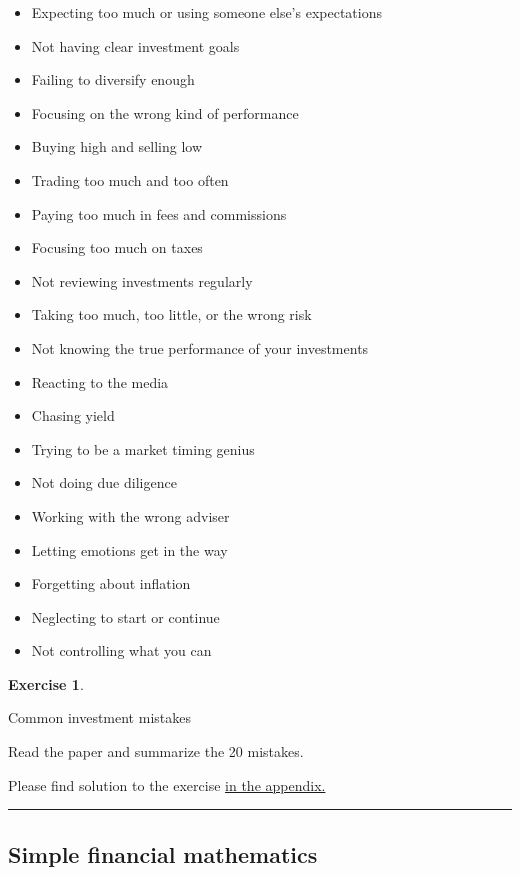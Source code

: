 \documentclass[
  12pt,
  oneside]{book}
\providecommand{\tightlist}{%
  \setlength{\itemsep}{0pt}\setlength{\parskip}{0pt}}
\theoremstyle{definition}
\theoremstyle{definition}
\theoremstyle{definition}
\newtheorem{exercise}{Exercise}[chapter]
\theoremstyle{definition}
\theoremstyle{remark}
\begin{document}
\begin{itemize}
\tightlist
\item
  Expecting too much or using someone else's expectations
\item
  Not having clear investment goals
\item
  Failing to diversify enough
\item
  Focusing on the wrong kind of performance
\item
  Buying high and selling low
\item
  Trading too much and too often
\item
  Paying too much in fees and commissions
\item
  Focusing too much on taxes
\item
  Not reviewing investments regularly
\item
  Taking too much, too little, or the wrong risk
\item
  Not knowing the true performance of your investments
\item
  Reacting to the media
\item
  Chasing yield
\item
  Trying to be a market timing genius
\item
  Not doing due diligence
\item
  Working with the wrong adviser
\item
  Letting emotions get in the way
\item
  Forgetting about inflation
\item
  Neglecting to start or continue
\item
  Not controlling what you can
\end{itemize}

\begin{exercise}
\protect\hypertarget{exr:commistakes}{}\label{exr:commistakes}

Common investment mistakes

Read the paper and summarize the 20 mistakes.

Please find solution to the exercise \protect\hyperlink{sol:commistakes}{in the appendix.}

\begin{center}\rule{0.5\linewidth}{0.5pt}\end{center}

\end{exercise}

\hypertarget{simple-financial-mathematics}{%
\subsection{Simple financial mathematics}\label{simple-financial-mathematics}}
\end{document}
